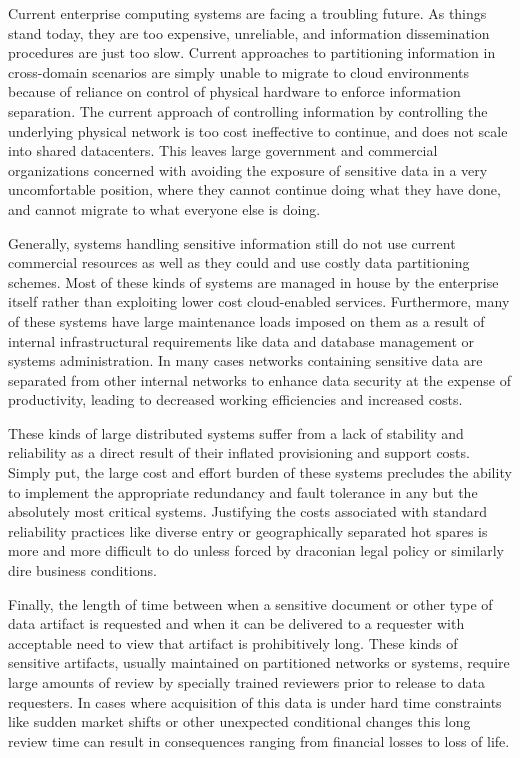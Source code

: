 Current enterprise computing systems are facing a troubling future.  As things stand today, they are too expensive, unreliable, and information dissemination procedures are just too slow.  Current approaches to partitioning information in cross-domain scenarios are simply unable to migrate to cloud environments because of reliance on control of physical hardware to enforce information separation.  The current approach of controlling information by controlling the underlying physical network is too cost ineffective to continue, and does not scale into shared datacenters.  This leaves large government and commercial organizations concerned with avoiding the exposure of sensitive data in a very uncomfortable position, where they cannot continue doing what they have done, and cannot migrate to what everyone else is doing.

Generally, systems handling sensitive information still do not use current commercial resources as well as they could and use costly data partitioning schemes.  Most of these kinds of systems are managed in house by the enterprise itself rather than exploiting lower cost cloud-enabled services.  Furthermore, many of these systems have large maintenance loads imposed on them as a result of internal infrastructural requirements like data and database management or systems administration.  In many cases networks containing sensitive data are separated from other internal networks to enhance data security at the expense of productivity, leading to decreased working efficiencies and increased costs.

These kinds of large distributed systems suffer from a lack of stability and reliability as a direct result of their inflated provisioning and support costs.  Simply put, the large cost and effort burden of these systems precludes the ability to implement the appropriate redundancy and fault tolerance in any but the absolutely most critical systems.  Justifying the costs associated with standard reliability practices like diverse entry or geographically separated hot spares is more and more difficult to do unless forced by draconian legal policy or similarly dire business conditions.

Finally, the length of time between when a sensitive document or other type of data artifact is requested and when it can be delivered to a requester with acceptable need to view that artifact is prohibitively long.  These kinds of sensitive artifacts, usually maintained on partitioned networks or systems, require large amounts of review by specially trained reviewers prior to release to data requesters.  In cases where acquisition of this data is under hard time constraints like sudden market shifts or other unexpected conditional changes this long review time can result in consequences ranging from financial losses to loss of life.

